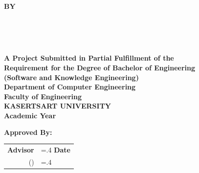 \thispagestyle{empty}
\begin{center}
    {\huge\textbf{\usevar{\srsTitle}}}\vspace{1in}

    {\huge\textbf{BY}}\vspace{.5in}

    {\huge\textbf{%
        \usevar{\srsAuthorOne} \\
        \usevar{\srsAuthorTwo} \\
        \usevar{\srsAuthorThree} \\
    }}\vfill

    {\large\textbf{%
        A Project Submitted in Partial Fulfillment of the\\
        Requirement for the Degree of Bachelor of Engineering\\
        (Software and Knowledge Engineering)\\
        Department of Computer Engineering\\
        Faculty of Engineering\\
        KASERTSART UNIVERSITY\\
        Academic Year \usevar{\srsAcademicYear}\\
    }}
\end{center}

\vspace{.5in}

{\large\textbf{Approved By:}}\vspace{.2in}

\begin{tabularx}{1\textwidth}{X >{\hsize=.4\hsize}X}
    \textbf{Advisor}\dotfill & \textbf{Date}\dotfill \\
    \multicolumn{1}{r}{(\usevar{\srsAdvisorName})} &  \multicolumn{1}{r}{} \\[.1in]


\end{tabularx}

\restoregeometry
